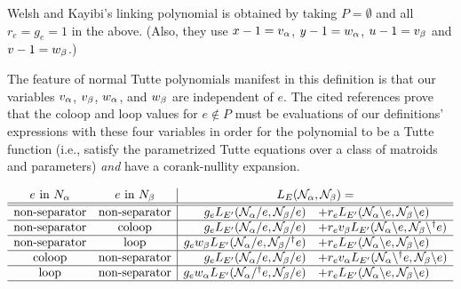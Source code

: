 \documentclass[Unicode]{cedram-alco}
\begin{document}
Welsh and Kayibi's linking polynomial is obtained by taking $P=\emptyset$ and
all $r_e=g_e=1$ in the above.  (Also, they use $x-1 = v_\alpha$, $y-1 = w_\alpha$,
$u-1=v_\beta$ and $v-1=w_\beta$.)


The feature of normal Tutte polynomials manifest in this definition
is that
our variables $v_\alpha$,
$v_\beta$, $w_\alpha$, and $w_\beta$ are independent of $e$.
The cited references prove that the coloop and loop values
for $e\not\in P$ must be evaluations of
our definitions' expressions with these four
variables  in order
for the polynomial to be a Tutte function (i.e., satisfy the
parametrized Tutte equations over a class of matroids and parameters)
\emph{and}
have a corank-nullity expansion.


\begin{theo}\label{pairbigtuttepolytheorem}
  \begin{equation*}
    \begin{array}{cc|rl}
      
      e \text{ in }N_\alpha  & e \text{ in }N_\beta &
      \multicolumn{2}{c}{L_E(\mathcal{N}_\alpha,\mathcal{N}_\beta)=} \\ \hline \hline
      

          
      \text{non-separator} & \text{non-separator} &
      g_e L_{E'}(\mathcal{N}_\alpha/e,  \mathcal{N}_\beta/e) &+
      r_e L_{E'}(\mathcal{N}_\alpha\backslash e,  \mathcal{N}_\beta \backslash e) \\ \hline
      



      \text{non-separator} & \text{coloop} &
      g_e L_{E'}(\mathcal{N}_\alpha/e,  \mathcal{N}_\beta/ e) &+
      r_e \V_\beta L_{E'}(\mathcal{N}_\alpha\backslash e,  \mathcal{N}_\beta \backslash^\dag e) \\  \hline
      
      \text{non-separator} & \text{loop} &
           g_e \W_\beta L_{E'}(\mathcal{N}_\alpha/e,  \mathcal{N}_\beta/^\dag e) &+
           r_e L_{E'}(\mathcal{N}_\alpha\backslash e,  \mathcal{N}_\beta \backslash e) \\  \hline
           
      \text{coloop} & \text{non-separator} &
      g_e L_{E'}(\mathcal{N}_\alpha/ e,  \mathcal{N}_\beta/e) &+
      r_e \V_\alpha L_{E'}(\mathcal{N}_\alpha\backslash^\dag e,  \mathcal{N}_\beta \backslash e) \\  \hline
      

      \text{loop} & \text{non-separator} &
           g_e \W_\alpha L_{E'}(\mathcal{N}_\alpha/^\dag e,  \mathcal{N}_\beta/e) &+
           r_e L_{E'}(\mathcal{N}_\alpha\backslash e,  \mathcal{N}_\beta \backslash e) \\  \hline
           





\end{array}
\end{equation*}
\end{theo}
\end{document}
